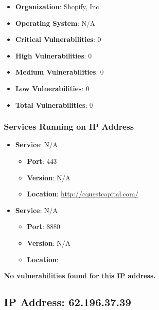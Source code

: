 \documentclass{article}
\begin{document}
\begin{itemize}
    \item \textbf{Organization}: Shopify, Inc.
    \item \textbf{Operating System}:  N/A 
    \item \textbf{Critical Vulnerabilities}: 0
    \item \textbf{High Vulnerabilities}: 0
    \item \textbf{Medium Vulnerabilities}: 0
    \item \textbf{Low Vulnerabilities}: 0
    \item \textbf{Total Vulnerabilities}: 0
\end{itemize}

\subsubsection*{Services Running on IP Address}

\begin{itemize}
    
        \item \textbf{Service}: N/A
        \begin{itemize}
            \item \textbf{Port}: 443
            \item \textbf{Version}:  N/A 
            \item \textbf{Location}: \href{ http://cquestcapital.com/ }{ http://cquestcapital.com/ }
        \end{itemize}
    
        \item \textbf{Service}: N/A
        \begin{itemize}
            \item \textbf{Port}: 8880
            \item \textbf{Version}:  N/A 
            \item \textbf{Location}: \href{  }{  }
        \end{itemize}
    
\end{itemize}


\textbf{No vulnerabilities found for this IP address.}




\clearpage



\subsection{IP Address: 62.196.37.39}
\end{document}
